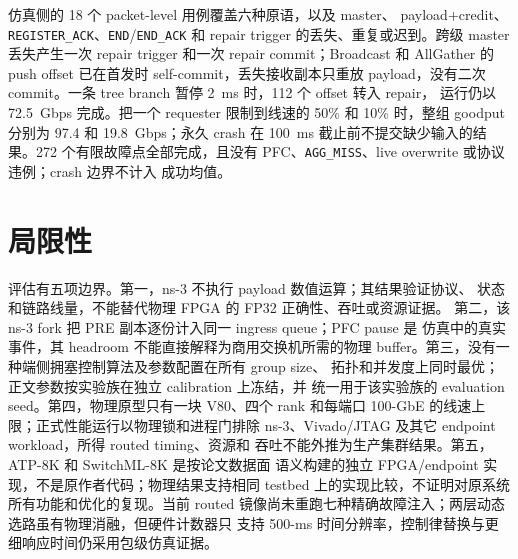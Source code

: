 仿真侧的 18 个 packet-level 用例覆盖六种原语，以及 master、
payload+credit、\texttt{REGISTER\_ACK}、\texttt{END}/\texttt{END\_ACK}
和 repair trigger 的丢失、重复或迟到。跨级 master 丢失产生一次
repair trigger 和一次 repair commit；Broadcast 和 AllGather 的 push
offset 已在首发时 self-commit，丢失接收副本只重放 payload，没有二次
commit。一条 tree branch 暂停 2~ms 时，112 个 offset 转入 repair，
运行仍以 72.5~Gbps 完成。把一个 requester 限制到线速的 50\% 和
10\% 时，整组 goodput 分别为 97.4 和 19.8~Gbps；永久 crash 在
100~ms 截止前不提交缺少输入的结果。272 个有限故障点全部完成，且没有
PFC、\texttt{AGG\_MISS}、live overwrite 或协议违例；crash 边界不计入
成功均值。

\section{局限性}

评估有五项边界。第一，ns-3 不执行 payload 数值运算；其结果验证协议、
状态和链路线量，不能替代物理 FPGA 的 FP32 正确性、吞吐或资源证据。
第二，该 ns-3 fork 把 PRE 副本逐份计入同一 ingress queue；PFC pause 是
仿真中的真实事件，其 headroom 不能直接解释为商用交换机所需的物理
buffer。第三，没有一种端侧拥塞控制算法及参数配置在所有 group size、
拓扑和并发度上同时最优；正文参数按实验族在独立 calibration 上冻结，并
统一用于该实验族的 evaluation seed。第四，物理原型只有一块 V80、四个
rank 和每端口 100-GbE 的线速上限；正式性能运行以物理锁和进程门排除
ns-3、Vivado/JTAG 及其它 endpoint workload，所得 routed timing、资源和
吞吐不能外推为生产集群结果。第五，ATP-8K 和 SwitchML-8K 是按论文数据面
语义构建的独立 FPGA/endpoint 实现，不是原作者代码；物理结果支持相同
testbed 上的实现比较，不证明对原系统所有功能和优化的复现。当前 routed
镜像尚未重跑七种精确故障注入；两层动态选路虽有物理消融，但硬件计数器只
支持 500-ms 时间分辨率，控制律替换与更细响应时间仍采用包级仿真证据。

\FloatBarrier
